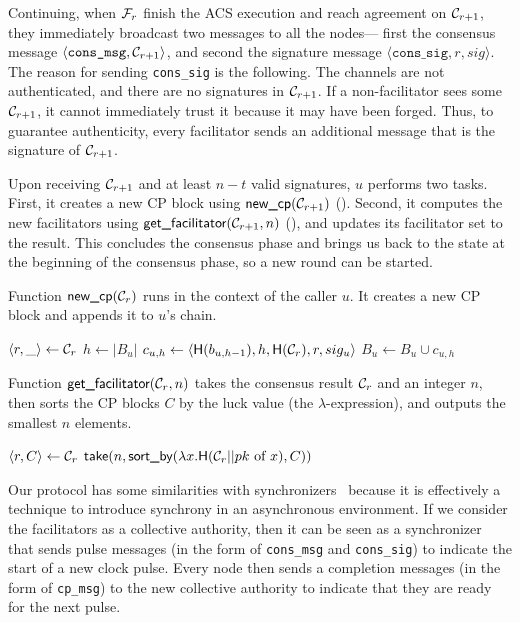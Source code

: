 Continuing, when $\mathcal{F}_{r}$ finish the ACS execution and reach agreement on $\mathcal{C}_{r+1}$,
they immediately broadcast two messages to all the nodes---
first the consensus message $\langle \texttt{cons\_msg}, \mathcal{C}_{r+1} \rangle$,
and second the signature message $\langle \texttt{cons\_sig}, r, sig \rangle$.
The reason for sending \texttt{cons\_sig} is the following.
The channels are not authenticated, 
and there are no signatures in $\mathcal{C}_{r + 1}$.
If a non-facilitator sees some $\mathcal{C}_{r + 1}$, it cannot immediately trust it because it may have been forged.
Thus, to guarantee authenticity, every facilitator sends an additional message that is the signature of $\mathcal{C}_{r + 1}$.

Upon receiving $\mathcal{C}_{r + 1}$ and at least $n - t$ valid signatures, $u$ performs two tasks.
First, it creates a new CP block using $\textsf{new\_cp}(\mathcal{C}_{r + 1})$ ().
Second, it computes the new facilitators using $\textsf{get\_facilitator}(\mathcal{C}_{r + 1}, n)$ (),
and updates its facilitator set to the result.
This concludes the consensus phase and brings us back to the state at the beginning of the consensus phase,
so a new round can be started.

\begin{algorithm}
\caption{Function $\textsf{new\_cp}(\mathcal{C}_r)$ runs in the context of the caller $u$.
It creates a new CP block and appends it to $u$'s chain.}
\label{alg:new-cp}
\begin{algorithmic}
\State $\langle r, \_ \rangle \gets \mathcal{C}_r$
\State $h \gets |B_u|$
\State $c_{u, h} \gets \langle \textsf{H}(b_{u, h-1}), h, \textsf{H}(\mathcal{C}_r), r, sig_u \rangle$
\State $B_u \gets B_u \cup c_{u, h}$
\end{algorithmic}
\end{algorithm}

\begin{algorithm}
\caption{Function $\textsf{get\_facilitator}(\mathcal{C}_r, n)$ takes the consensus result $\mathcal{C}_r$ and an integer $n$,
then sorts the CP blocks $C$ by the luck value (the $\lambda$-expression), and outputs the smallest $n$ elements.}
\label{alg:facilitator}
\begin{algorithmic}
\State $\langle r, C \rangle \gets \mathcal{C}_r$
\State \Return $\textsf{take} (n, \textsf{sort\_by} (\lambda x.\textsf{H}(\mathcal{C}_r || pk \text{ of } x), C))$
\end{algorithmic}
\end{algorithm}


Our protocol has some similarities with synchronizers~\cite[Chapter 10]{podc} because it is effectively a technique to introduce synchrony in an asynchronous environment.
If we consider the facilitators as a collective authority, then it can be seen as a synchronizer that sends pulse messages (in the form of \texttt{cons\_msg} and \texttt{cons\_sig}) to indicate the start of a new clock pulse.
Every node then sends a completion messages (in the form of \texttt{cp\_msg}) to the new collective authority to indicate that they are ready for the next pulse.


